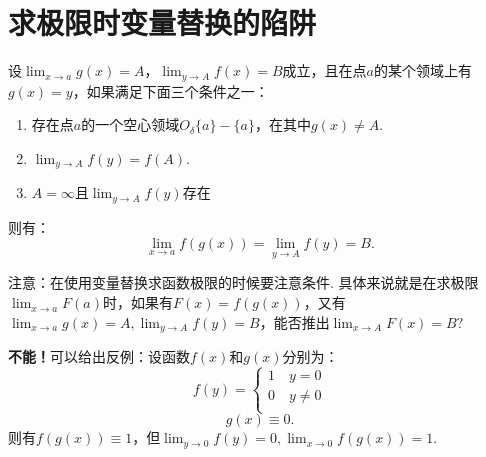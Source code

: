 \section{求极限时变量替换的陷阱}

\begin{proposition}[变量替换的充分条件]
	设$\displaystyle\lim_{x\to a}g(x)=A$，$\displaystyle\lim_{y\to A}f(x)=B$成立，且在点$a$的某个领域上有$g(x)=y$，如果满足下面三个条件之一：
	\begin{enumerate}
		\item 存在点$a$的一个空心领域$O_{\delta}\{a\}-\{a\}$，在其中$g(x)\neq A$.
		\item $\displaystyle\lim_{y\to A}f(y)=f(A)$.
		\item $A=\infty$且$\displaystyle\lim_{y\to A}f(y)存在$
	\end{enumerate}	
	则有：
	\begin{equation}
		\displaystyle\lim_{x\to a}f(g(x))=\displaystyle\lim_{y\to A}f(y)=B.
	\end{equation}
\end{proposition}

注意：在使用变量替换求函数极限的时候要注意条件. 具体来说就是在求极限$\displaystyle\lim_{x\to a}F(a)$时，如果有$F(x)=f(g(x))$，又有$\displaystyle\lim_{x\to a}g(x)=A,\displaystyle\lim_{y\to A}f(y)=B$，能否推出$\displaystyle\lim_{x\to A}F(x)=B?$

\textbf{不能！}可以给出反例：设函数$f(x)$和$g(x)$分别为：
\begin{equation}
	f(y)=\left\{
	\begin{aligned}
		1 \quad y=0\\
		0 \quad y\neq 0\\
	\end{aligned}
	\right
	.
\end{equation}
\begin{equation}
	g(x)\equiv 0.
\end{equation}
则有$f(g(x))\equiv 1$，但$\displaystyle\lim_{y\to 0}f(y)=0,\displaystyle\lim_{x\to 0}f(g(x))=1.$
